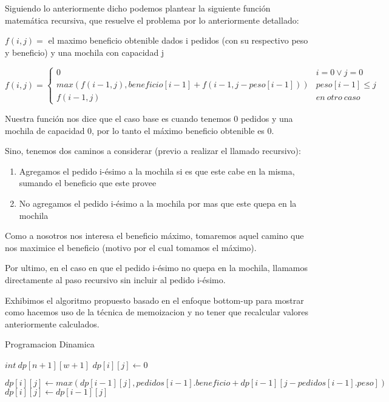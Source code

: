 Siguiendo lo anteriormente dicho podemos plantear la siguiente función matemática recursiva, que resuelve el problema por lo anteriormente detallado:


$f(i,j) =$ el maximo beneficio obtenible dados i pedidos (con su respectivo peso y beneficio) y una mochila con capacidad j


\begin{equation*}
	f(i,j) = \begin{cases}
          0 & i = 0 \lor j = 0 \\
          max(f(i-1,j), beneficio[i-1] + f(i-1, j-peso[i-1])) & peso[i-1] \leq j \\
          f(i-1, j) & en\ otro\ caso
       \end{cases}
\end{equation*}

Nuestra función nos dice que el caso base es cuando tenemos 0 pedidos y una mochila de capacidad 0, por lo tanto el máximo beneficio obtenible es 0.

Sino, tenemos dos caminos a considerar (previo a realizar el llamado recursivo):
\begin{enumerate}
	\item Agregamos el pedido i-ésimo a la mochila si es que este cabe en la misma, sumando el beneficio que este provee
	\item No agregamos el pedido i-ésimo a la mochila por mas que este quepa en la mochila
\end{enumerate}


Como a nosotros nos interesa el beneficio máximo, tomaremos aquel camino que nos maximice el beneficio (motivo por el cual tomamos el máximo).


Por ultimo, en el caso en que el pedido i-ésimo no quepa en la mochila, llamamos directamente al paso recursivo sin incluir al pedido i-ésimo.



Exhibimos el algoritmo propuesto basado en el enfoque bottom-up para mostrar como hacemos uso de la técnica de memoizacion y no tener que recalcular valores anteriormente calculados.

\begin{algorithm}
\caption{Programacion Dinamica}\label{selection}
\begin{algorithmic}[1]
	\State $int \ dp[n+1][w+1]$
    				\State $dp[i][j] \gets 0$

    			\Else
					\State $dp[i][j] \gets max(dp[i-1][j], pedidos[i-1].beneficio + dp[i-1][j-pedidos[i-1].peso])$
				\Else
					\State $dp[i][j] \gets dp[i-1][j]$
				\EndIf
			\EndIf
		\EndFor
    \EndFor


\EndProcedure
\end{algorithmic}
\end{algorithm}


